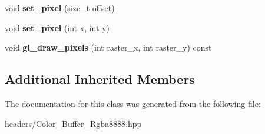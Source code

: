 \begin{DoxyCompactItemize}
\item 
\mbox{\label{class_project1__3_d_a_1_1_color___buffer___rgba8888_aa5435536acc37229f67cfede5a8cb561}} 
void {\bfseries set\+\_\+pixel} (size\+\_\+t offset)
\item 
\mbox{\label{class_project1__3_d_a_1_1_color___buffer___rgba8888_a1b61cd458cec745a5adebb11f88f2ded}} 
void {\bfseries set\+\_\+pixel} (int x, int y)
\item 
\mbox{\label{class_project1__3_d_a_1_1_color___buffer___rgba8888_a021fd6059619a994c18e51335c65895f}} 
void {\bfseries gl\+\_\+draw\+\_\+pixels} (int raster\+\_\+x, int raster\+\_\+y) const
\end{DoxyCompactItemize}
\subsection*{Additional Inherited Members}


The documentation for this class was generated from the following file\+:\begin{DoxyCompactItemize}
\item 
headers/Color\+\_\+\+Buffer\+\_\+\+Rgba8888.\+hpp\end{DoxyCompactItemize}

